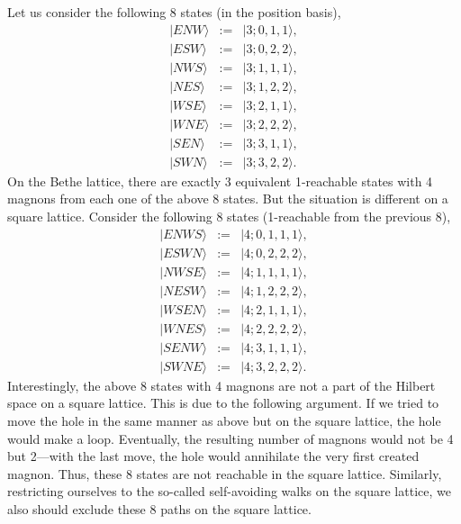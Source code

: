 \documentclass[10pt, a4paper, onecolumn]{article}
\newcommand{\ket}[1]{\vert #1 \rangle}
\begin{document}
Let us consider the following 8 states (in the position basis),
\begin{eqnarray}
	\ket{ENW} &:=& \ket{3;0,1,1}, \\
	\ket{ESW} &:=& \ket{3;0,2,2}, \\
	\ket{NWS} &:=& \ket{3;1,1,1}, \\
	\ket{NES} &:=& \ket{3;1,2,2}, \\
	\ket{WSE} &:=& \ket{3;2,1,1}, \\
	\ket{WNE} &:=& \ket{3;2,2,2}, \\
	\ket{SEN} &:=& \ket{3;3,1,1}, \\
	\ket{SWN} &:=& \ket{3;3,2,2}.
\end{eqnarray}
On the Bethe lattice, there are exactly 3 equivalent 1-reachable states with 4 magnons from each one of the above 8 states. But the situation is different on a square lattice. Consider the following 8 states (1-reachable from the previous 8),
\begin{eqnarray}
	\ket{ENWS} &:=& \ket{4;0,1,1,1}, \\
	\ket{ESWN} &:=& \ket{4;0,2,2,2}, \\
	\ket{NWSE} &:=& \ket{4;1,1,1,1}, \\
	\ket{NESW} &:=& \ket{4;1,2,2,2}, \\
	\ket{WSEN} &:=& \ket{4;2,1,1,1}, \\
	\ket{WNES} &:=& \ket{4;2,2,2,2}, \\
	\ket{SENW} &:=& \ket{4;3,1,1,1}, \\
	\ket{SWNE} &:=& \ket{4;3,2,2,2}.
\end{eqnarray}
Interestingly, the above 8 states with 4 magnons are not a part of the Hilbert space on a square lattice. This is due to the following argument. If we tried to move the hole in the same manner as above but on the square lattice, the hole would make a loop. Eventually, the resulting number of magnons would not be 4 but 2---with the last move, the hole would annihilate the very first created magnon. Thus, these 8 states are not reachable in the square lattice. Similarly, restricting ourselves to the so-called self-avoiding walks on the square lattice, we also should exclude these 8 paths on the square lattice. 
\end{document}
